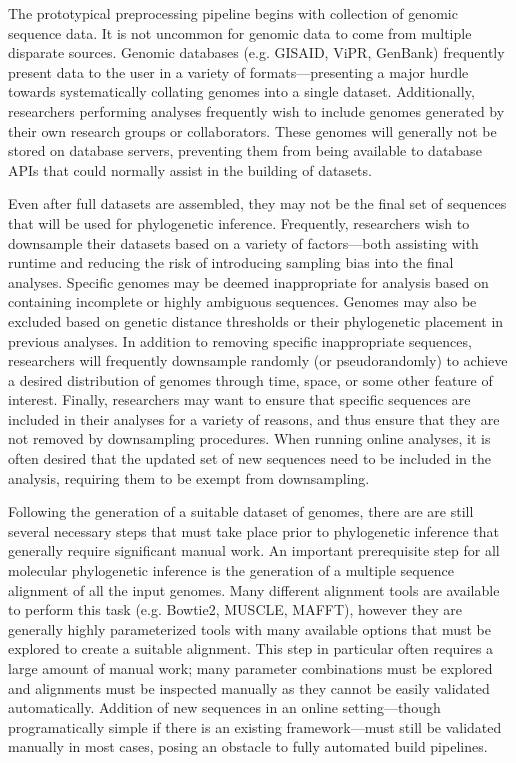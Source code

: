 The prototypical preprocessing pipeline begins with collection of genomic sequence data.
It is not uncommon for genomic data to come from multiple disparate sources.
Genomic databases (e.g. GISAID\cite{shu2017gisaid}, ViPR\cite{pickett2012vipr}, GenBank\cite{benson2012genbank}) frequently present data to the user in a variety of formats---presenting a major hurdle towards systematically collating genomes into a single dataset.
Additionally, researchers performing analyses frequently wish to include genomes generated by their own research groups or collaborators.
These genomes will generally not be stored on database servers, preventing them from being available to database APIs that could normally assist in the building of datasets.

Even after full datasets are assembled, they may not be the final set of sequences that will be used for phylogenetic inference.
Frequently, researchers wish to downsample their datasets based on a variety of factors---both assisting with runtime and reducing the risk of introducing sampling bias into the final analyses.
Specific genomes may be deemed inappropriate for analysis based on containing incomplete or highly ambiguous sequences.
Genomes may also be excluded based on genetic distance thresholds or their phylogenetic placement in previous analyses.
In addition to removing specific inappropriate sequences, researchers will frequently downsample randomly (or pseudorandomly) to achieve a desired distribution of genomes through time, space, or some other feature of interest.
Finally, researchers may want to ensure that specific sequences are included in their analyses for a variety of reasons, and thus ensure that they are not removed by downsampling procedures.
When running online analyses, it is often desired that the updated set of new sequences need to be included in the analysis, requiring them to be exempt from downsampling.

Following the generation of a suitable dataset of genomes, there are are still several necessary steps that must take place prior to phylogenetic inference that generally require significant manual work.
An important prerequisite step for all molecular phylogenetic inference is the generation of a multiple sequence alignment of all the input genomes.
Many different alignment tools are available to perform this task (e.g. Bowtie2\cite{langmead2012fast}, MUSCLE\cite{edgar2004muscle}, MAFFT\cite{katoh2013mafft}), however they are generally highly parameterized tools with many available options that must be explored to create a suitable alignment.
This step in particular often requires a large amount of manual work; many parameter combinations must be explored and alignments must be inspected manually as they cannot be easily validated automatically.
Addition of new sequences in an online setting---though programatically simple if there is an existing framework---must still be validated manually in most cases, posing an obstacle to fully automated build pipelines.

